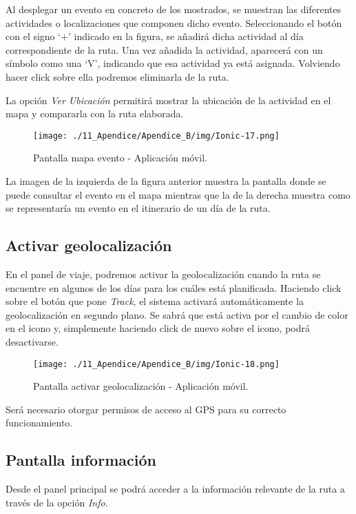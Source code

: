 Al desplegar un evento en concreto de los mostrados, se muestran las diferentes actividades o localizaciones que componen dicho evento. Seleccionando el botón con el signo `+' indicado en la figura, se añadirá dicha actividad al día correspondiente de la ruta. Una vez añadida la actividad, aparecerá con un símbolo como una `V', indicando que esa actividad ya está asignada. Volviendo hacer click sobre ella podremos eliminarla de la ruta.

La opción \textit{Ver Ubicación} permitirá mostrar la ubicación de la actividad en el mapa y compararla con la ruta elaborada. 

\begin{figure}[H]
\centering
\texttt{[image: ./11\_Apendice/Apendice\_B/img/Ionic-17.png]}
\caption{Pantalla mapa evento - Aplicación móvil.}
\end{figure}

La imagen de la izquierda de la figura anterior muestra la pantalla donde se puede consultar el evento en el mapa mientras que la de la derecha muestra como se representaría un evento en el itinerario de un día de la ruta. 


\newpage
\subsection*{Activar geolocalización}
En el panel de viaje, podremos activar la geolocalización cuando la ruta se encuentre en algunos de los días para los cuáles está planificada. Haciendo click sobre el botón que pone \textit{Track}, el sistema activará automáticamente la geolocalización en segundo plano. Se sabrá que está activa por el cambio de color en el icono y, simplemente haciendo click de nuevo sobre el icono, podrá desactivarse.


\begin{figure}[H]
\centering
\texttt{[image: ./11\_Apendice/Apendice\_B/img/Ionic-18.png]}
\caption{Pantalla activar geolocalización - Aplicación móvil.}
\end{figure}

Será necesario otorgar permisos de acceso al GPS para su correcto funcionamiento.

\newpage
\subsection*{Pantalla información}
Desde el panel principal se podrá acceder a la información relevante de la ruta a través de la opción \textit{Info}.



